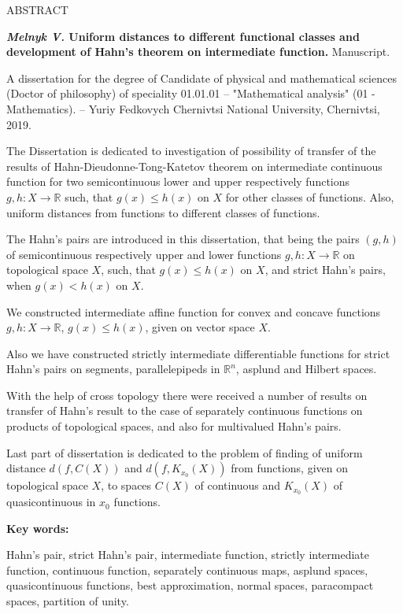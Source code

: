 
\begin{center}
ABSTRACT
\end{center}

\textbf{\emph{Melnyk V.} Uniform distances to different functional classes and development of Hahn's theorem on intermediate function.} Manuscript.

\vspace{0.1 cm}

A dissertation for the degree  of Candidate of physical and mathematical sciences (Doctor of philosophy) of speciality 01.01.01 -- "Mathematical analysis" (01 - Mathematics). -- Yuriy Fedkovych Chernivtsi National University, Chernivtsi, 2019.

\vspace{\baselineskip}
The Dissertation is dedicated to investigation of possibility of transfer of the results of Hahn-Dieudonne-Tong-Katetov theorem on intermediate continuous function for two semicontinuous lower and upper respectively functions $g,h:X\rightarrow \mathbb{R}$ such, that $g(x)\leq h(x)$ on $X$ for other classes of functions. Also, uniform distances from functions to different classes of functions.

The Hahn's pairs are introduced in this dissertation, that being the pairs $(g,h)$ of semicontinuous respectively upper and lower functions $g,h:X\rightarrow \mathbb{R}$ on topological space $X$, such, that $g(x)\leq h(x)$ on $X$, and strict Hahn's pairs, when $g(x)<h(x)$ on $X$.

We constructed intermediate affine function for convex and concave functions $g,h:X\rightarrow \mathbb{R}$, $g(x)\leq h(x)$, given on vector space $X$.

Also we have constructed strictly intermediate differentiable functions for strict Hahn's pairs on segments, parallelepipeds in $\mathbb{R}^{n}$, asplund and Hilbert spaces.

With the help of cross topology there were received a number of results on transfer of Hahn's result to the case of separately continuous functions on products of topological spaces, and also for multivalued Hahn's pairs.

Last part of dissertation is dedicated to the problem of finding of uniform distance $d(f,C(X))$ and $d(f,K_{x_{0}}(X))$ from functions, given on topological space $X$, to spaces $C(X)$ of continuous and $K_{x_{0}}(X)$ of quasicontinuous in $x_{0}$ functions.


 \textbf{Key words:}

Hahn's pair, strict Hahn's pair, intermediate function, strictly intermediate function, continuous function, separately continuous maps, asplund spaces, quasicontinuous functions, best approximation, normal spaces, paracompact spaces, partition of unity.

